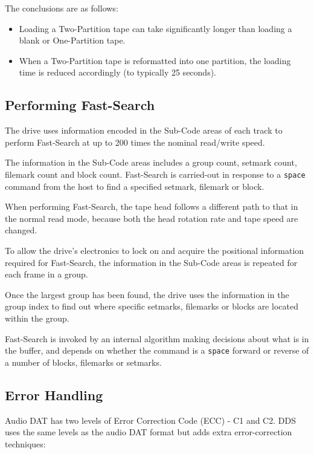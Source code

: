 The conclusions are as follows:

\begin {itemize}

\item Loading a Two-Partition tape can take significantly longer than loading
a blank or One-Partition tape.

\item When a Two-Partition tape is reformatted into one partition, the
loading time is reduced accordingly (to typically 25 seconds).

\end {itemize}

\subsection {Performing Fast-Search}

The drive uses information encoded in the Sub-Code areas of each track to
perform Fast-Search at up to 200 times the nominal read/write speed.

The information in the Sub-Code areas includes a group count, setmark count,
filemark count and block count. Fast-Search is carried-out in response to a
{\tt space} command from the host to find a specified setmark, filemark or
block.

When performing Fast-Search, the tape head follows a different path to that
in the normal read mode, because both the head rotation rate and tape speed
are changed.

To allow the drive's electronics to lock on and acquire the positional
information required for Fast-Search, the information in the Sub-Code areas
is repeated for each frame in a group.

Once the largest group has been found, the drive uses the information in the
group index to find out where specific setmarks, filemarks or blocks are
located within the group.

Fast-Search is invoked by an internal algorithm making decisions about what
is in the buffer, and depends on whether the command is a {\tt space} forward
or reverse of a number of blocks, filemarks or setmarks.

\subsection {Error Handling}

Audio DAT has two levels of Error Correction Code (ECC) - C1 and C2. DDS
uses the same levels as the audio DAT format but adds extra error-correction
techniques:

